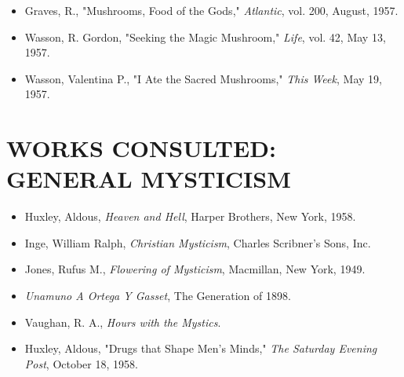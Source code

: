 \begin{itemize}
	\item Graves, R., "Mushrooms, Food of the Gods," \textit{Atlantic}, vol. 200, August, 1957.
	\item Wasson, R. Gordon, "Seeking the Magic Mushroom," \textit{Life}, vol. 42, May 13, 1957.
	\item Wasson, Valentina P., "I Ate the Sacred Mushrooms," \textit{This Week}, May 19, 1957.
\end{itemize}

\section*{\centering WORKS CONSULTED: GENERAL MYSTICISM}

\begin{itemize}
	\item Huxley, Aldous, \textit{Heaven and Hell}, Harper Brothers, New York, 1958.
	\item Inge, William Ralph, \textit{Christian Mysticism}, Charles Scribner's Sons, Inc.
	\item Jones, Rufus M., \textit{Flowering of Mysticism}, Macmillan, New York, 1949.
	\item \textit{Unamuno A Ortega Y Gasset}, The Generation of 1898.
	\item Vaughan, R. A., \textit{Hours with the Mystics}.
	\item Huxley, Aldous, "Drugs that Shape Men's Minds," \textit{The Saturday Evening Post}, October 18, 1958.
\end{itemize}

